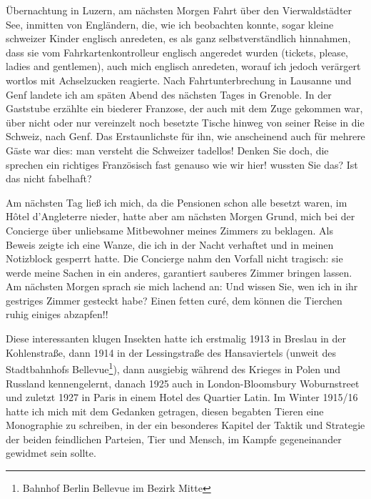 Übernachtung in Luzern, am nächsten Morgen Fahrt über den Vierwaldstädter See, inmitten von Engländern, die, wie ich beobachten konnte, sogar kleine schweizer Kinder englisch anredeten, es als ganz selbstverständlich hinnahmen, dass sie vom Fahrkartenkontrolleur englisch angeredet wurden (tickets, please, ladies and gentlemen), auch mich englisch anredeten, worauf ich jedoch verärgert wortlos mit Achselzucken reagierte. Nach Fahrtunterbrechung in Lausanne und Genf landete ich am späten Abend des nächsten Tages in Grenoble. In der Gaststube erzählte ein biederer Franzose, der auch mit dem Zuge gekommen war, über nicht oder nur vereinzelt noch besetzte Tische hinweg von seiner Reise in die Schweiz, nach Genf. Das Erstaunlichste für ihn, wie anscheinend auch für mehrere Gäste war dies: man versteht die Schweizer tadellos! Denken Sie doch, die sprechen ein richtiges Französisch fast genauso wie wir hier! wussten Sie das? Ist das nicht fabelhaft?

Am nächsten Tag ließ ich mich, da die Pensionen schon alle besetzt waren, im Hôtel d'Angleterre nieder, hatte aber am nächsten Morgen Grund, mich bei der Concierge über unliebsame Mitbewohner meines Zimmers zu beklagen. Als Beweis zeigte ich eine Wanze, die ich in der Nacht verhaftet und in meinen Notizblock gesperrt hatte. Die Concierge nahm den Vorfall nicht tragisch: sie werde meine Sachen in ein anderes, garantiert sauberes Zimmer bringen lassen. Am nächsten Morgen sprach sie mich lachend an: Und wissen Sie, wen ich in ihr gestriges Zimmer gesteckt habe? Einen fetten curé, dem können die Tierchen ruhig einiges abzapfen!!

Diese interessanten klugen Insekten hatte ich erstmalig 1913 in Breslau in der Kohlenstraße, dann 1914 in der Lessingstraße des Hansaviertels (unweit des Stadtbahnhofs Bellevue\footnote{Bahnhof Berlin Bellevue im Bezirk Mitte}), dann ausgiebig während des Krieges in Polen und Russland kennengelernt, danach 1925 auch in London-Bloomsbury Woburnstreet und zuletzt 1927 in Paris in einem Hotel des Quartier Latin. Im Winter 1915/16 hatte ich mich mit dem Gedanken getragen, diesen begabten Tieren eine Monographie zu schreiben, in der ein besonderes Kapitel der Taktik und Strategie der beiden feindlichen Parteien, Tier und Mensch, im Kampfe gegeneinander gewidmet sein sollte.\\

